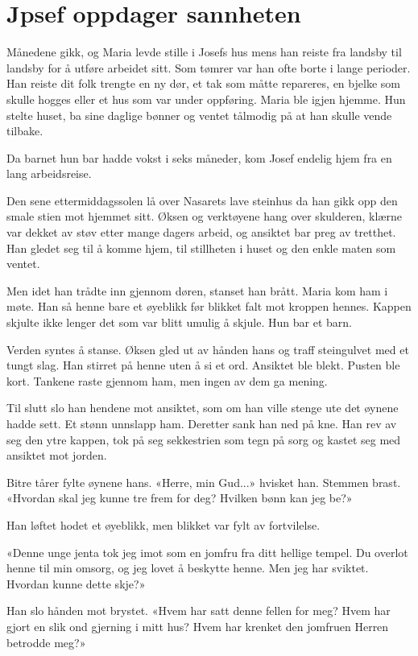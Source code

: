 \chapter{Jpsef oppdager sannheten}



Månedene gikk, og Maria levde stille i Josefs hus mens
han reiste fra landsby til landsby for å utføre arbeidet sitt.
Som tømrer var han ofte borte i lange perioder. Han reiste
dit folk trengte en ny dør, et tak som måtte repareres,
en bjelke som skulle hogges eller et hus som var under oppføring.
Maria ble igjen hjemme. Hun stelte huset,
ba sine daglige bønner og ventet
tålmodig på at han skulle vende tilbake.

Da barnet hun bar hadde vokst i seks måneder,
kom Josef endelig hjem fra en lang arbeidsreise.

Den sene ettermiddagssolen lå over Nasarets lave steinhus
da han gikk opp den smale stien mot hjemmet sitt. Øksen og
verktøyene hang over skulderen, klærne var dekket av støv
etter mange dagers arbeid, og ansiktet bar preg av tretthet.
Han gledet seg til å komme hjem, til stillheten i huset
og den enkle maten som ventet.

Men idet han trådte inn gjennom døren, stanset han brått.
Maria kom ham i møte.
Han så henne bare et øyeblikk før blikket falt mot kroppen hennes.
Kappen skjulte ikke lenger det som var blitt umulig å skjule. Hun bar et barn.

Verden syntes å stanse.
Øksen gled ut av hånden hans og traff steingulvet med et tungt slag.
Han stirret på henne uten å si et ord. Ansiktet ble blekt. Pusten ble kort.
Tankene raste gjennom ham, men ingen av dem ga mening.

Til slutt slo han hendene mot ansiktet,
som om han ville stenge ute det øynene hadde sett.
Et stønn unnslapp ham.
Deretter sank han ned på kne. Han rev av seg den ytre kappen, tok på seg sekkestrien som tegn på sorg og kastet seg med ansiktet mot jorden.

Bitre tårer fylte øynene hans. «Herre, min Gud...» hvisket han.
Stemmen brast.
«Hvordan skal jeg kunne tre frem for deg? Hvilken bønn kan jeg be?»

Han løftet hodet et øyeblikk, men blikket var fylt av fortvilelse.

«Denne unge jenta tok jeg imot som en jomfru fra ditt hellige tempel.
Du overlot henne til min omsorg, og jeg lovet å beskytte henne.
Men jeg har sviktet. Hvordan kunne dette skje?»

Han slo hånden mot brystet.
«Hvem har satt denne fellen for meg? Hvem har gjort en slik ond gjerning i mitt hus? Hvem har krenket den jomfruen Herren betrodde meg?»


